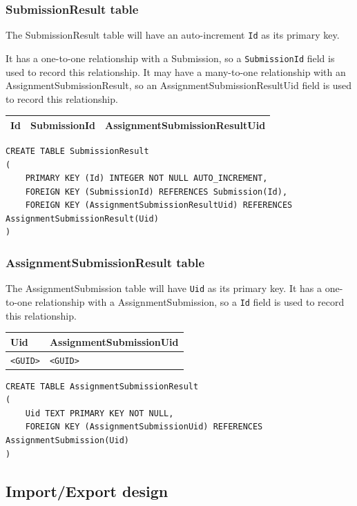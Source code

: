 \documentclass[a4paper]{report}
\newcommand{\code}{\texttt}
\begin{document}
\subsubsection{SubmissionResult table}

The SubmissionResult table will have an auto-increment \code{Id} as its primary key.

It has a one-to-one relationship with a Submission, so a \code{SubmissionId} field is used to record this relationship. It may have a many-to-one relationship with an AssignmentSubmissionResult, so an AssignmentSubmissionResultUid field is used to record this relationship. 

\begin{tabulary}{\textwidth}{|L|L|L|}
    \hline
    Id & SubmissionId & AssignmentSubmissionResultUid \\
    \hline
\end{tabulary}

\begin{verbatim}
CREATE TABLE SubmissionResult
(
    PRIMARY KEY (Id) INTEGER NOT NULL AUTO_INCREMENT,
    FOREIGN KEY (SubmissionId) REFERENCES Submission(Id),
    FOREIGN KEY (AssignmentSubmissionResultUid) REFERENCES AssignmentSubmissionResult(Uid)
)
\end{verbatim}

\subsubsection{AssignmentSubmissionResult table}

The AssignmentSubmission table will have \code{Uid} as its primary key. It has a one-to-one relationship with a AssignmentSubmission, so a \code{Id} field is used to record this relationship.

\begin{tabulary}{\textwidth}{|L|L|}
    \hline
    Uid & AssignmentSubmissionUid \\
    \hline
    \code{<GUID>} & \code{<GUID>} \\
    \hline
\end{tabulary}

\begin{verbatim}
CREATE TABLE AssignmentSubmissionResult
(
    Uid TEXT PRIMARY KEY NOT NULL,
    FOREIGN KEY (AssignmentSubmissionUid) REFERENCES AssignmentSubmission(Uid)
)
\end{verbatim}

\subsection{Import/Export design}
\end{document}
